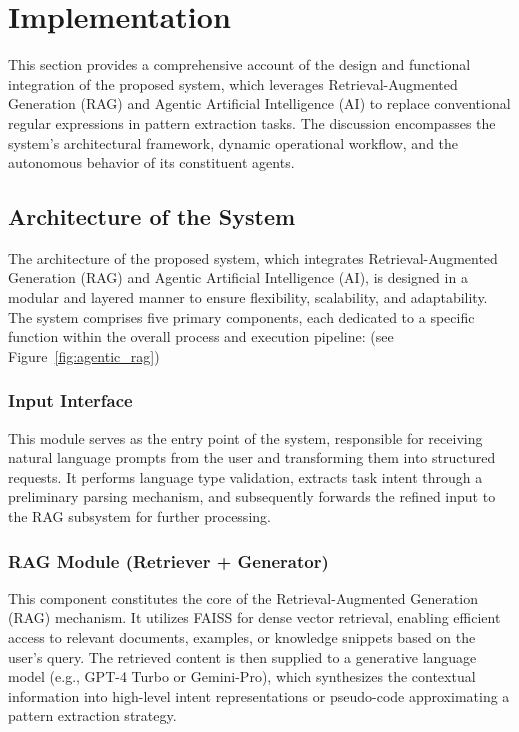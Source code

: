 \chapter{Implementation}

This section provides a comprehensive account of the design and functional integration of the proposed system, which leverages Retrieval-Augmented Generation (RAG) and Agentic Artificial Intelligence (AI) to replace conventional regular expressions in pattern extraction tasks. The discussion encompasses the system's architectural framework, dynamic operational workflow, and the autonomous behavior of its constituent agents.

\section{Architecture of the System}
The architecture of the proposed system, which integrates Retrieval-Augmented Generation (RAG) and Agentic Artificial Intelligence (AI), is designed in a modular and layered manner to ensure flexibility, scalability, and adaptability. The system comprises five primary components, each dedicated to a specific function within the overall process and execution pipeline: (see Figure~\ref{fig:agentic_rag})


\subsection{Input Interface}
This module serves as the entry point of the system, responsible for receiving natural language prompts from the user and transforming them into structured requests. It performs language type validation, extracts task intent through a preliminary parsing mechanism, and subsequently forwards the refined input to the RAG subsystem for further processing.

\subsection{RAG Module (Retriever + Generator)}
This component constitutes the core of the Retrieval-Augmented Generation (RAG) mechanism. It utilizes FAISS for dense vector retrieval, enabling efficient access to relevant documents, examples, or knowledge snippets based on the user's query. The retrieved content is then supplied to a generative language model (e.g., GPT-4 Turbo or Gemini-Pro), which synthesizes the contextual information into high-level intent representations or pseudo-code approximating a pattern extraction strategy.


